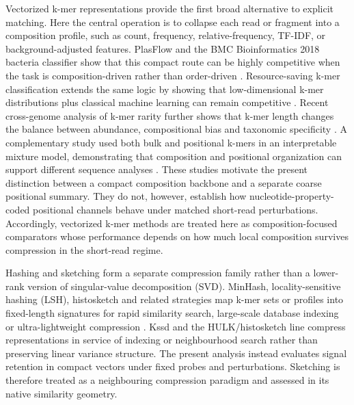 Vectorized k-mer representations provide the first broad alternative to explicit matching. Here the central operation is to collapse each read or fragment into a composition profile, such as count, frequency, relative-frequency, TF-IDF, or background-adjusted features. PlasFlow and the BMC Bioinformatics 2018 bacteria classifier show that this compact route can be highly competitive when the task is composition-driven rather than order-driven \citep{PlasFlow2018,Fiannaca2018}. Resource-saving k-mer classification extends the same logic by showing that low-dimensional k-mer distributions plus classical machine learning can remain competitive \citep{Fuhl2023}. Recent cross-genome analysis of k-mer rarity further shows that k-mer length changes the balance between abundance, compositional bias and taxonomic specificity \citep{Chantzi2024Rarity}. A complementary study used both bulk and positional k-mers in an interpretable mixture model, demonstrating that composition and positional organization can support different sequence analyses \citep{Wang2024LDA}. These studies motivate the present distinction between a compact composition backbone and a separate coarse positional summary. They do not, however, establish how nucleotide-property-coded positional channels behave under matched short-read perturbations. Accordingly, vectorized k-mer methods are treated here as composition-focused comparators whose performance depends on how much local composition survives compression in the short-read regime.

Hashing and sketching form a separate compression family rather than a lower-rank version of singular-value decomposition (SVD). MinHash, locality-sensitive hashing (LSH), histosketch and related strategies map k-mer sets or profiles into fixed-length signatures for rapid similarity search, large-scale database indexing or ultra-lightweight compression \citep{Ondov2016,Zielezinski2017,Kssd2021,HULK2019}. Kssd and the HULK/histosketch line compress representations in service of indexing or neighbourhood search rather than preserving linear variance structure. The present analysis instead evaluates signal retention in compact vectors under fixed probes and perturbations. Sketching is therefore treated as a neighbouring compression paradigm and assessed in its native similarity geometry.

